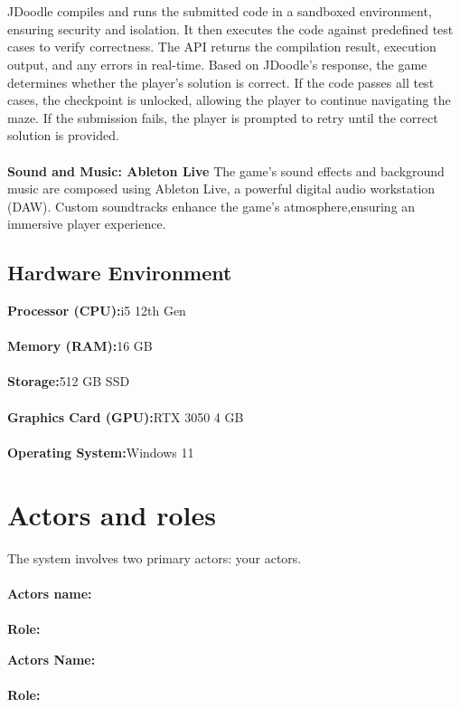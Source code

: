 \\\\
JDoodle compiles and runs the submitted code in a sandboxed environment, ensuring security and isolation. It then executes the code against predefined test cases to verify correctness. The API returns the compilation result, execution output, and any errors in real-time. Based on JDoodle's response, the game determines whether the player's solution is correct. If the code passes all test cases, the checkpoint is unlocked, allowing the player to continue navigating the maze. If the submission fails, the player is prompted to retry until the correct solution is provided.\\\\
\textbf{Sound and Music: Ableton Live}
The game’s sound effects and background music are composed using Ableton Live, a powerful digital audio workstation (DAW). Custom soundtracks enhance the game’s atmosphere,ensuring an immersive player experience.
 
 
 \subsection{Hardware Environment}
 \textbf{Processor (CPU):}i5 12th Gen\\\\
 \textbf{Memory (RAM):}16 GB\\\\
 \textbf{Storage:}512 GB SSD\\\\
 \textbf{Graphics Card (GPU):}RTX 3050 4 GB\\\\
 \textbf{Operating System:}Windows 11
 \newpage
 
 \section{Actors and roles}
 The system involves two primary actors: your actors.\\\\
\noindent
\textbf{Actors name:}
\\\\
 \textbf{Role:}
 \begin{itemize}

\end{itemize}
\noindent
\textbf{Actors Name:}
\\\\
\textbf{Role:}
\begin{itemize}

\end{itemize}
 
 